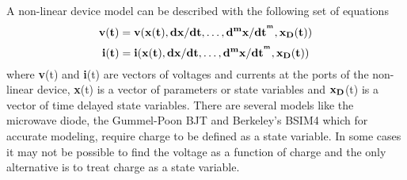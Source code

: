 A non-linear device model can be described with the following set of equations
\begin{equation}
  \bf{v} ( t ) = \bf{v} ( x ( t ), dx / dt, \ldots,
  d^m x / dt^{^m}, x_D ( t ))
\end{equation}
\begin{equation}
  \bf{i} ( t ) = \bf{i} ( x ( t ), dx / dt, \ldots,
  d^m x / dt^{^m}, x_D ( t ))
\end{equation}
where \textbf{v}(t) and \textbf{i}(t) are vectors of voltages and currents at
the ports of the non-linear device, \textbf{x}(t) is a vector of parameters or
state variables and $\bf{x_D}$(t) is a vector of time delayed state
variables. There are several models like the microwave diode, the Gummel-Poon
BJT and Berkeley's BSIM4 which for accurate modeling, require charge to be
defined as a state variable. In some cases it may not be possible to find the
voltage as a function of charge and the only alternative is to treat charge as
a state variable.

